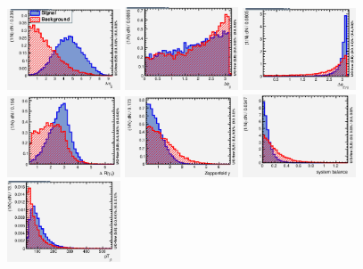 \begin{figure}[tb]
	\begin{center}
		\includegraphics[width=0.3\textwidth]{fig/MVA/deta_jj_vbf.png}
		\includegraphics[width=0.3\textwidth]{fig/MVA/dphi_jj_vbf.png}
		\includegraphics[width=0.3\textwidth]{fig/MVA/dphi_zgjj_vbf.png}
		\includegraphics[width=0.3\textwidth]{fig/MVA/dr_gj_vbf.png}
		\includegraphics[width=0.3\textwidth]{fig/MVA/zepp_vbf.png}
		\includegraphics[width=0.3\textwidth]{fig/MVA/ptbal_vbf.png}
		\includegraphics[width=0.3\textwidth]{fig/MVA/ptj1_vbf.png}

\end{center}
\end{figure}
